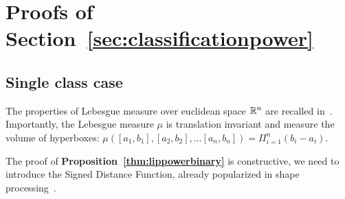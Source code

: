 \tableofcontents

\section{Proofs of Section~\ref{sec:classificationpower}}\label{app:classificationpower}

    \subsection{Single class case}
    
    The properties of Lebesgue measure over euclidean space $\mathbb{R}^n$ are recalled in~\cite{royden1988real}. Importantly, the Lebesgue measure $\mu$ is translation invariant and measure the volume of hyperboxes:  $\mu([a_1,b_1],[a_2,b_2],\ldots [a_n,b_n])=\Pi_{i=1}^n(b_i-a_i)$. 
    
    \lippowerbinary*

    The proof of \textbf{Proposition~\ref{thm:lippowerbinary}} is constructive, we need to introduce the Signed Distance Function, already popularized in shape processing~\cite{rousson2002shape}.  
    
